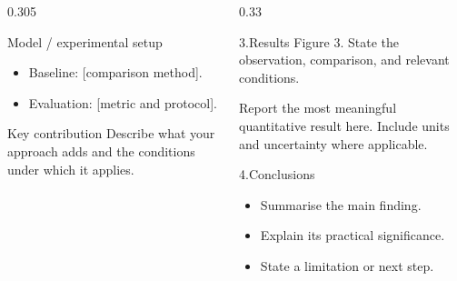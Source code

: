 \documentclass[final]{beamer}
\begin{document}
\begin{frame}[t]
\begin{columns}[t,onlytextwidth]
\begin{column}{0.305\textwidth}
\begin{block}{Model / experimental setup}
\begin{itemize}
      \item Baseline: [comparison method].
      \item Evaluation: [metric and protocol].
    \end{itemize}
  \end{block}
  \begin{block}{Key contribution}
    Describe what your approach adds and the conditions under which it applies.
  \end{block}
\end{column}
\begin{column}{0.33\textwidth}
  \begin{block}{3.\enspace Results}
    {\small Figure 3. State the observation, comparison, and relevant conditions.}
    \par\medskip
    Report the most meaningful quantitative result here. Include units and uncertainty where applicable.
  \end{block}
  \begin{alertblock}{4.\enspace Conclusions}
    \begin{itemize}
      \item Summarise the main finding.
      \item Explain its practical significance.
      \item State a limitation or next step.
    \end{itemize}
  \end{alertblock}
\end{column}
\end{columns}
\end{frame}
\end{document}
